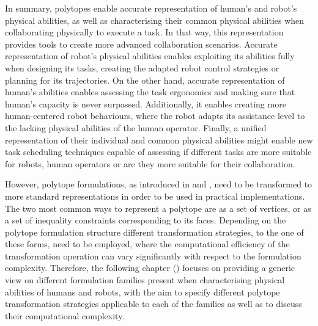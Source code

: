 In summary, polytopes enable accurate representation of human's and robot's physical abilities, as well as characterising their common physical abilities when collaborating physically to execute a task. In that way, this representation provides tools to create more advanced collaboration scenarios. 
Accurate representation of robot's physical abilities enables exploiting its abilities fully when designing its tasks, creating the adapted robot control strategies or planning for its trajectories. On the other hand, accurate representation of human's abilities enables assessing the task ergonomics and making sure that human's capacity is never surpassed. Additionally, it enables creating more human-centered robot behaviours, where the robot adapts its assistance level to the lacking physical abilities of the human operator. 
Finally, a unified representation of their individual and common physical abilities might enable new task scheduling techniques capable of assessing if different tasks are more suitable for robots, human operators or are they more suitable for their collaboration. 

However, polytope formulations, as introduced in  and , need to be transformed to more standard representations in order to  be used in practical implementations. The two most common ways to represent a polytope are as a set of vertices, or as a set of inequality constraints corresponding to its faces. Depending on the polytope formulation structure different transformation strategies, to the one of these forms, need to be employed, where the computational efficiency of the transformation operation can vary significantly with respect to the formulation complexity. Therefore, the following chapter () focuses on providing a generic view on different formulation families present when characterising physical abilities of humans and robots, with the aim to specify different polytope transformation strategies applicable to each of the families as well as to discuss their computational complexity.
